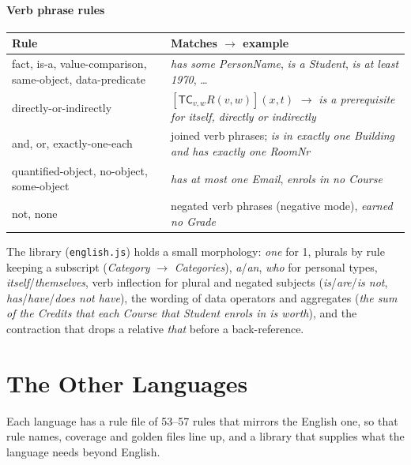 \documentclass[11pt, a4paper]{article}
\newcommand{\code}[1]{\texttt{\color{codefg}#1}}
\begin{document}
\paragraph{Verb phrase rules}
\begin{center}
\small
\begin{tabularx}{\textwidth}{>{\raggedright\arraybackslash\leavevmode\ttfamily\color{codefg}}p{} X}
\toprule
\normalfont\textbf{Rule} & \textbf{Matches $\to$ example} \\
\midrule
fact, is-a, value-comparison, same-object, data-predicate & \textit{has some PersonName}, \textit{is a Student}, \textit{is at least 1970}, \ldots \\
directly-or-indirectly & $[\mathsf{TC}_{v,w}R(v,w)](x,t)$ $\to$ \textit{is a prerequisite for itself, directly or indirectly} \\
and, or, exactly-one-each & joined verb phrases; \textit{is in exactly one Building and has exactly one RoomNr} \\
quantified-object, no-object, some-object & \textit{has at most one Email}, \textit{enrols in no Course} \\
not, none & negated verb phrases (negative mode), \textit{earned no Grade} \\
\bottomrule
\bottomrule
\end{tabularx}
\end{center}

The library (\code{english.js}) holds a small morphology: \textit{one} for 1,
plurals by rule keeping a subscript (\textit{Category} $\to$
\textit{Categories}), \textit{a}/\textit{an}, \textit{who} for personal
types, \textit{itself}/\textit{themselves}, verb inflection for plural and
negated subjects (\textit{is}/\textit{are}/\textit{is not},
\textit{has}/\textit{have}/\textit{does not have}), the wording of data
operators and aggregates (\textit{the sum of the Credits that each Course
that Student enrols in is worth}), and the contraction that drops a relative
\textit{that} before a back-reference.

\section{The Other Languages}

Each language has a rule file of 53--57 rules that mirrors the English one,
so that rule names, coverage and golden files line up, and a library that
supplies what the language needs beyond English.
\end{document}
